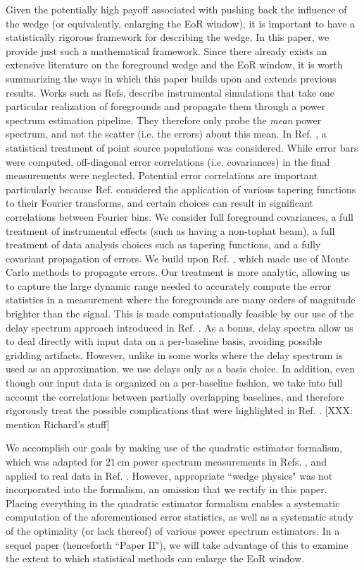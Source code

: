 \documentclass[twocolumn,aps,prd,nofootinbib,showpacs]{revtex4-1}
\begin{document}
Given the potentially high payoff associated with pushing back the influence of the wedge (or equivalently, enlarging the EoR window), it is important to have a statistically rigorous framework for describing the wedge.  In this paper, we provide just such a mathematical framework.  Since there already exists an extensive literature on the foreground wedge and the EoR window, it is worth summarizing the ways in which this paper builds upon and extends previous results.  Works such as Refs. \cite{Datta2010,Vedantham2012,Morales2012} describe instrumental simulations that take one particular realization of foregrounds and propagate them through a power spectrum estimation pipeline.  They therefore only probe the \emph{mean} power spectrum, and not the scatter (i.e. the errors) about this mean.  In Ref. \cite{Thyagarajan2013}, a statistical treatment of point source populations was considered.  While error bars were computed, off-diagonal error correlations (i.e. covariances) in the final measurements were neglected.  Potential error correlations are important particularly because Ref. \cite{Thyagarajan2013} considered the application of various tapering functions to their Fourier transforms, and certain choices can result in significant correlations between Fourier bins.  We consider full foreground covariances, a full treatment of instrumental effects (such as having a non-tophat beam), a full treatment of data analysis choices such as tapering functions, and a fully covariant propagation of errors.  We build upon Ref. \cite{Trott2012}, which made use of Monte Carlo methods to propagate errors.  Our treatment is more analytic, allowing us to capture the large dynamic range needed to accurately compute the error statistics in a measurement where the foregrounds are many orders of magnitude brighter than the signal.  This is made computationally feasible by our use of the delay spectrum approach introduced in Ref. \cite{Parsons2012b}.  As a bonus, delay spectra allow us to deal directly with input data on a per-baseline basis, avoiding possible gridding artifacts.  However, unlike in some works where the delay spectrum is used as an approximation, we use delays only as a basis choice.  In addition, even though our input data is organized on a per-baseline fashion, we take into full account the correlations between partially overlapping baselines, and therefore rigorously treat the possible complications that were highlighted in Ref. \cite{Hazelton2013}.  [XXX: mention Richard's stuff]

We accomplish our goals by making use of the quadratic estimator formalism, which was adapted for $21\,\textrm{cm}$ power spectrum measurements in Refs. \cite{Liu2011,Dillon2013}, and applied to real data in Ref. \cite{Dillon2014}.  However, appropriate ``wedge physics" was not incorporated into the formalism, an omission that we rectify in this paper.  Placing everything in the quadratic estimator formalism enables a systematic computation of the aforementioned error statistics, as well as a systematic study of the optimality (or lack thereof) of various power spectrum estimators.  In a sequel paper (henceforth ``Paper II"), we will take advantage of this to examine the extent to which statistical methods can enlarge the EoR window.
\end{document}
